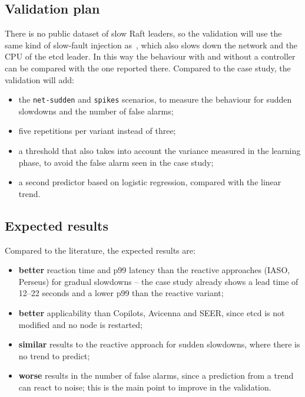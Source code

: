 \documentclass[11pt,a4paper]{article}
\begin{document}
\subsection{Validation plan}

There is no public dataset of slow Raft leaders, so the validation will use the same kind of slow-fault injection as~\cite{onesize}, which also slows down the network and the CPU of the etcd leader. In this way the behaviour with and without a controller can be compared with the one reported there. Compared to the case study, the validation will add:
\begin{itemize}
  \item the \texttt{net-sudden} and \texttt{spikes} scenarios, to measure the behaviour for sudden slowdowns and the number of false alarms;
  \item five repetitions per variant instead of three;
  \item a threshold that also takes into account the variance measured in the learning phase, to avoid the false alarm seen in the case study;
  \item a second predictor based on logistic regression, compared with the linear trend.
\end{itemize}

\subsection{Expected results}

Compared to the literature, the expected results are:
\begin{itemize}
  \item \textbf{better} reaction time and p99 latency than the reactive approaches (IASO, Perseus) for gradual slowdowns -- the case study already shows a lead time of 12--22 seconds and a lower p99 than the reactive variant;
  \item \textbf{better} applicability than Copilots, Avicenna and SEER, since etcd is not modified and no node is restarted;
  \item \textbf{similar} results to the reactive approach for sudden slowdowns, where there is no trend to predict;
  \item \textbf{worse} results in the number of false alarms, since a prediction from a trend can react to noise; this is the main point to improve in the validation.
\end{itemize}



\end{document}
